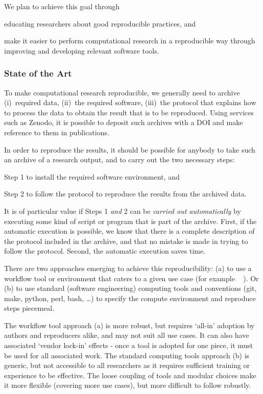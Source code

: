 We plan to achieve this goal through
\begin{compactitem}
\item educating researchers about good reproducible practices, and
\item make it easier to perform computational research in a reproducible way
  through improving and developing relevant software tools.
\end{compactitem}

\subsubsection{State of the Art}

To make computational research reproducible, we generally need to archive
(i)~required data, (ii)~the required software, (iii)~the protocol that explains
how to process the data to obtain the result that is to be reproduced. Using
services such as Zenodo, it is possible to deposit such archives with a DOI and
make reference to them in publications.

In order to reproduce the results, it should be possible for anybody to take such an archive of a research
output, and to carry out the two necessary steps:
\begin{compactitem}
\item Step 1 to install the required software environment, and
\item Step 2 to follow the protocol to reproduce the results from the archived data.
\end{compactitem}

It is of particular value if Steps 1 \emph{and} 2 can be \emph{carried out
  automatically} by executing some kind of script or program that is part of the
archive. First, if the automatic execution is possible, we know that there is a
complete description of the protocol included in the archive, and that no
mistake is made in trying to follow the protocol. Second, the automatic
execution saves time.

There are two approaches emerging to achieve this reproducibility: (a) to use a
workflow tool or environment that caters to a given use case (for example
~\cite{reana2019} ). Or (b) to use standard
(software engineering) computing tools and conventions (git, make, python, perl,
bash, \ldots) to specify the compute environment and reproduce steps piecemeal.

The workflow tool approach (a) is more robust, but requires `all-in' adoption by authors and reproducers alike,
and may not suit all use cases. It can also have associated `vendor lock-in' effects
- once a tool is adopted for one piece, it must be used for all associated work.
The standard computing tools approach (b) is generic, but not accessible to all researchers
 as it requires sufficient training or experience to be effective.
 The loose coupling of tools and modular choices make it more flexible (covering more use cases),
 but more difficult to follow robustly.

